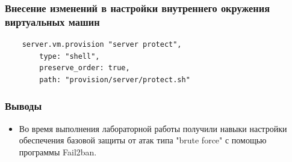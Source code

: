 \begin{frame}[fragile]
\frametitle{Внесение изменений в настройки внутреннего окружения виртуальных машин}
\begin{verbatim}
    server.vm.provision "server protect",
        type: "shell",
        preserve_order: true,
        path: "provision/server/protect.sh"
\end{verbatim}
\end{frame}

\begin{frame}
\frametitle{Выводы}
\begin{itemize}
    \item Во время выполнения лабораторной работы получили навыки настройки обеспечения базовой защиты от атак типа "brute force" с помощью программы Fail2ban.
\end{itemize}
\end{frame}

